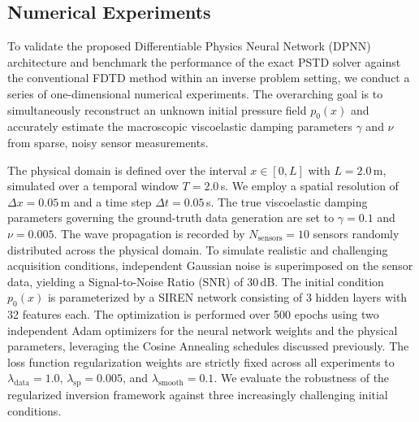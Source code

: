 \documentclass{Configuration_Files/PoliMi3i_thesis}
\begin{document}
\subsection{Numerical Experiments}
\label{subsec:dpnn_experiments}
To validate the proposed Differentiable Physics Neural Network (DPNN) architecture and benchmark the performance of the exact PSTD solver against the conventional FDTD method within an inverse problem setting, we conduct a series of one-dimensional numerical experiments. The overarching goal is to simultaneously reconstruct an unknown initial pressure field $p_0(x)$ and accurately estimate the macroscopic viscoelastic damping parameters $\gamma$ and $\nu$ from sparse, noisy sensor measurements.

The physical domain is defined over the interval $x \in [0, L]$ with $L = 2.0$\,m, simulated over a temporal window $T = 2.0$\,s. We employ a spatial resolution of $\Delta x = 0.05$\,m and a time step $\Delta t = 0.05$\,s. The true viscoelastic damping parameters governing the ground-truth data generation are set to $\gamma = 0.1$ and $\nu = 0.005$. The wave propagation is recorded by $N_{\text{sensors}} = 10$ sensors randomly distributed across the physical domain. To simulate realistic and challenging acquisition conditions, independent Gaussian noise is superimposed on the sensor data, yielding a Signal-to-Noise Ratio (SNR) of 30\,dB.
The initial condition $p_0(x)$ is parameterized by a SIREN network consisting of 3 hidden layers with 32 features each. The optimization is performed over 500 epochs using two independent Adam optimizers for the neural network weights and the physical parameters, leveraging the Cosine Annealing schedules discussed previously. The loss function regularization weights are strictly fixed across all experiments to $\lambda_{\mathrm{data}} = 1.0$, $\lambda_{\text{sp}} = 0.005$, and $\lambda_{\text{smooth}} = 0.1$. 
We evaluate the robustness of the regularized inversion framework against three increasingly challenging initial conditions.

\newpage
\end{document}
